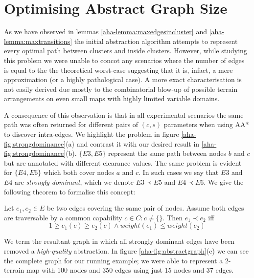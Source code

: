 \section{Optimising Abstract Graph Size}
\par \indent
As we have observed in lemmas \ref{aha-lemma:maxedgesincluster} and \ref{aha-lemma:maxtransitions} the initial abstraction algorithm attempts to represent every optimal path between clusters and inside clusters. However, while studying this problem we were unable to concot any scenarios where the number of edges is equal to the the theoretical worst-case suggesting that it is, infact, a mere approximation (or a highly pathological case).  A more exact characterisation is not easily derived due mostly to the combinatorial blow-up of possible terrain arrangements on even small maps with highly limited variable domains.
\par \indent 
A consequence of this observation is that in all experimental scenarios the same path was often returned for different pairs of $(c, s)$ parameters when using AA* to discover intra-edges. We highlight the problem in figure \ref{aha-fig:strongdominance}(a) and contrast it with our desired result in \ref{aha-fig:strongdominance}(b). $\lbrace E3, E5 \rbrace$ represent the same path between nodes $b$ and $c$ but are annotated with different clearance values. The same problem is evident for $\lbrace E4, E6 \rbrace$ which both cover nodes $a$ and $c$. In such cases we say that $E3$ and $E4$ are \emph{strongly dominant}, which we denote $E3 \prec E5$ and $E4 \prec E6$. We give the following theorem to formalise this concept:

\begin{theorem}
\label{aha-theorem:strongdominance}
Let $e_{1}, e_{2} \in E$ be two edges covering the same pair of nodes. Assume both edges are traversable by a common capability $c \in C : c \neq \lbrace \rbrace$. Then $e_{1} \prec e_{2}$ iff
$$ 1 \geq e_{1}(c) \geq e_{2}(c) \wedge weight(e_{1}) \leq weight(e_{2})$$
\end{theorem}

We term the resultant graph in which all strongly dominant edges have been removed a \emph{high-quality} abstraction. 
In figure \ref{aha-fig:abstractgraph}(c) we can see the complete graph for our running example; we were able to represent a 2-terrain map with 100 nodes and 350 edges using just 15 nodes and  37 edges. 

